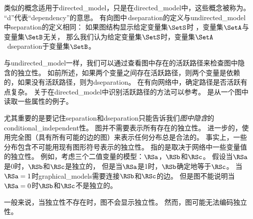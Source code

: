 类似的概念适用于\gls{directed_model}，只是在\gls{directed_model}中，这些概念被称为。
``d''代表``\gls{dependency}''的意思。
有向图中\,\gls{dseparation}的定义与\gls{undirected_model}中\gls{separation}的定义相同：
如果图结构显示给定变量集$\SetS$时 ，变量集$\SetA$与变量集$\SetB$无关， 那么我们认为给定变量集$\SetS$时，变量集$\SetA$~\gls{dseparation}于变量集$\SetB$。


与\gls{undirected_model}一样，我们可以通过查看图中存在的活跃路径来检查图中隐含的独立性。
如前所述，如果两个变量之间存在活跃路径，则两个变量是依赖的，如果没有活跃路径，则为\gls{dseparation}。
在有向网络中，确定路径是否活跃有点复杂。
关于在\gls{directed_model}中识别活跃路径的方法可以参考。 
是从一个图中读取一些属性的例子。





尤其重要的是要记住\gls{separation}和\gls{dseparation}只能告诉我们\emph{图中隐含}的\gls{conditional_independent}性。
图并不需要表示所有存在的独立性。 
进一步的，使用完全图（具有所有可能的边的图）来表示任何分布总是合法的。
事实上，一些分布包含不可能用现有图形符号表示的独立性。
指的是取决于网络中一些变量值的独立性。
例如，考虑三个二值变量的模型：$\RSa$，$\RSb $和$\RSc$。
假设当$\RSa$是0时，$\RSb$和$\RSc$是独立的， 但是当$\RSa$是1时，$\RSb$确定地等于$\RSc$。
当$\RSa = 1$时\gls{graphical_models}需要连接$\RSb$和$\RSc$的边。
但是图不能说明当$\RSa = 0$时$\RSb$和$\RSc$不是独立的。

一般来说，当独立性不存在时，图不会显示独立性。 
然而，图可能无法编码独立性。



